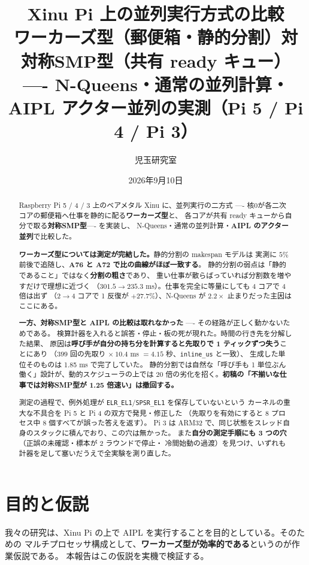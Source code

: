 \documentclass[a4paper,11pt]{ltjsarticle}
\title{Xinu Pi 上の並列実行方式の比較\\
\large ワーカーズ型（郵便箱・静的分割）対 対称SMP型（共有 ready キュー）\\
\normalsize ---- N-Queens・通常の並列計算・AIPL アクター並列の実測（Pi 5 / Pi 4 / Pi 3）}
\author{児玉研究室}
\date{2026年9月10日}
\begin{document}
\maketitle

\begin{abstract}
Raspberry Pi 5 / 4 / 3 上のベアメタル Xinu に、並列実行の二方式 ----
核0が各二次コアの郵便箱へ仕事を静的に配る\textbf{ワーカーズ型}と、
各コアが共有 ready キューから自分で取る\textbf{対称SMP型}---- を実装し、
N-Queens・通常の並列計算・\textbf{AIPL のアクター並列}で比較した。

\textbf{ワーカーズ型については測定が完結した。}静的分割の makespan モデルは
実測に $5\%$ 前後で追随し、\textbf{A76 と A72 で比の曲線がほぼ一致する}。
静的分割の弱点は「静的であること」ではなく\textbf{分割の粗さ}であり、
重い仕事が散らばっていれば分割数を増やすだけで理想に近づく
（$301.5 \to 235.3$ ms）。仕事を完全に等量にしても 4 コアで 4 倍は出ず
（2$\to$4 コアで 1 反復が $+27.7\%$）、N-Queens が $2.2\times$ 止まりだった主因はここにある。

\textbf{一方、対称SMP型と AIPL の比較は取れなかった} ---- その経路が正しく動かないためである。
検算計器を入れると誤答・停止・板の死が現れた。時間の行き先を分解した結果、
原因は\textbf{呼び手が自分の持ち分を計算すると先取りで 1 ティックずつ失う}ことにあり
（$399$ 回の先取り $\times\ 10.4$ ms $=4.15$ 秒、\texttt{inline\_us} と一致）、
生成した単位そのものは 1.85 ms で完了していた。
静的分割では自然な「呼び手も 1 単位ぶん働く」設計が、動的スケジューラの上では
20 倍の劣化を招く。\textbf{初稿の「不揃いな仕事では対称SMP型が 1.25 倍速い」は撤回する。}

測定の過程で、例外処理が \texttt{ELR\_EL1}/\texttt{SPSR\_EL1} を保存していないという
カーネルの重大な不具合を Pi 5 と Pi 4 の双方で発見・修正した
（先取りを有効にすると 8 プロセス中 8 個すべてが誤った答えを返す）。
Pi 3 は ARM32 で、同じ状態をスレッド自身のスタックに積んでおり、この穴は無かった。
また\textbf{自分の測定手順にも 3 つの穴}（正誤の未確認・標本が 2 ラウンドで停止・
冷間始動の過渡）を見つけ、いずれも計器を足して塞いだうえで全実験を測り直した。
\end{abstract}

\section{目的と仮説}

我々の研究は、Xinu Pi の上で AIPL を実行することを目的としている。そのための
マルチプロセッサ構成として、\textbf{ワーカーズ型が効率的である}というのが作業仮説である。
本報告はこの仮説を実機で検証する。
\end{document}
